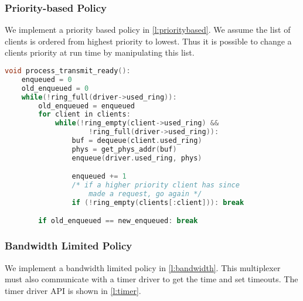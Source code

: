 \subsubsection{Priority-based Policy}

We implement a priority based policy in \autoref{l:prioritybased}. We assume the list of
clients is ordered from highest priority to lowest. Thus it is possible to change a clients
priority at run time by manipulating this list.\\

\begin{minipage}{\textwidth}
    \centering
    \begin{lstlisting}[tabsize=2, language=C, caption={Transmit Priority-based Policy},frame=tb, 
                        label={l:prioritybased}, captionpos=b]
void process_transmit_ready():
    enqueued = 0
    old_enqueued = 0
    while(!ring_full(driver->used_ring)):
        old_enqueued = enqueued
        for client in clients:
            while(!ring_empty(client->used_ring) &&
                    !ring_full(driver->used_ring)):
                buf = dequeue(client.used_ring)
                phys = get_phys_addr(buf)
                enqueue(driver.used_ring, phys)

                enqueued += 1
                /* if a higher priority client has since 
                    made a request, go again */
                if (!ring_empty(clients[:client])): break

        if old_enqueued == new_enqueued: break
\end{lstlisting}
\end{minipage}

\subsubsection{Bandwidth Limited Policy}

We implement a bandwidth limited policy in \autoref{l:bandwidth}. This multiplexer must
also communicate with a timer driver to get the time and set timeouts. The timer driver
API is shown in \autoref{l:timer}.

